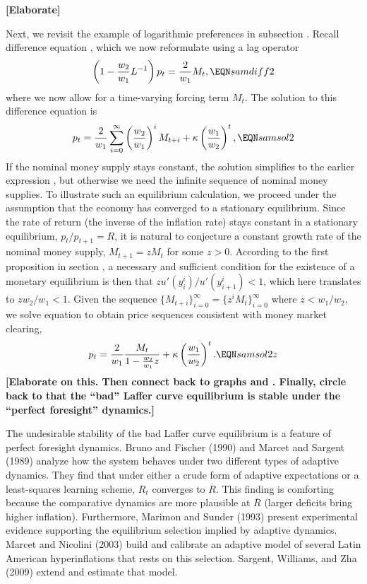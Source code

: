 \medskip
\noindent
{\bf [Elaborate]}
\medskip

Next, we revisit the example of logarithmic preferences in
subsection . Recall difference equation 
, which we now reformulate using a lag operator
$$\left( 1 - {w_2 \over w_1} L^{-1} \right) p_t = {2 \over w_1} M_t,
                                                       \EQN samdiff2
$$
where we now allow for a time-varying forcing term
$M_t$. The solution to this difference equation is
$$ p_t = {2 \over w_1} \sum_{i=0}^\infty \left({w_2 \over w_1}\right)^i M_{t+i}
      + \kappa \left({w_1\over w_2}\right)^t, \EQN samsol2 $$
If the nominal money supply stays constant, the solution simplifies
to the earlier expression , but otherwise we need the infinite sequence
of nominal money supplies. To illustrate such an equilibrium
calculation, we proceed under the assumption that the economy has converged 
to a stationary equilibrium. Since the rate of return (the
inverse of the inflation rate) stays constant in a stationary equilibrium,
$p_t/p_{t+1}=R$, it is natural to conjecture a constant growth rate of the
nominal money supply, $M_{t+1} = zM_t$ for some $z>0$. According to
the first proposition in section , a necessary 
and sufficient condition for the existence of a monetary equilibrium
is then that $z u'(y^i_i)/u'(y^i_{i+1})<1$, which here translates
to  $z w_2/w_1<1$.
Given the sequence $\{M_{t+i}\}_{i=0}^\infty=\{z^i M_t\}_{i=0}^\infty$
where $z<w_1/w_2$,  we solve equation  to obtain  
price sequences consistent with money market clearing,
$$ p_t = {2 \over w_1} { M_t \over 1 - {w_2 \over w_1} z }
      + \kappa \left({w_1\over w_2}\right)^t. \EQN samsol2z 
$$
\medskip
\noindent
{\bf [Elaborate on this. Then connect back to graphs 
and . Finally, circle back to that the ``bad'' Laffer curve 
equilibrium is stable under the ``perfect foresight'' dynamics.]}


The undesirable stability of the bad Laffer curve equilibrium is a feature of
perfect foresight dynamics.
Bruno and Fischer (1990) and Marcet and Sargent (1989) analyze
how the system behaves under two different types of adaptive
dynamics.  They find that under either a crude form
of  adaptive expectations  or a least-squares learning scheme,
$R_t$ converges to  $\overline R$.   This finding  is comforting because
the comparative dynamics are more plausible at $\overline  R$
(larger deficits bring higher inflation).  Furthermore,
Marimon and Sunder (1993) present experimental evidence
supporting the equilibrium selection implied by adaptive dynamics.
Marcet and Nicolini  (2003) build and calibrate an adaptive model of several
Latin American hyperinflations that rests on this selection. Sargent, Williams, and Zha (2009)
extend and estimate that model.
%
%








